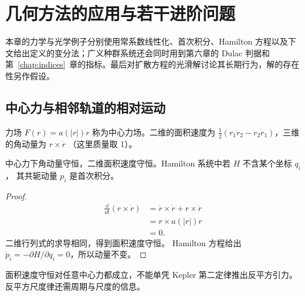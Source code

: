 \chapter{几何方法的应用与若干进阶问题}\label{chap:applications}

本章的力学与光学例子分别使用常系数线性化、首次积分、Hamilton 方程以及下文给出定义的变分法；广义种群系统还会同时用到第六章的 Dulac 判据和第~\ref{chap:indices}~章的指标。最后对扩散方程的光滑解讨论其长期行为，解的存在性另作假设。

\section{中心力与相邻轨道的相对运动}
\begin{definition}
力场 $F(r)=a(|r|)r$ 称为中心力场。二维的面积速度为
$\frac12(r_1\dot r_2-r_2\dot r_1)$，三维的角动量为 $r\times\dot r$
（这里质量取 1）。
\end{definition}
\begin{proposition}
中心力下角动量守恒，二维面积速度守恒。Hamilton 系统中若 $H$ 不含某个坐标 $q_i$，
其共轭动量 $p_i$ 是首次积分。
\end{proposition}
\begin{proof}
\[
 \begin{aligned}
 \frac{\dd}{\dd t}(r\times\dot r)
 &=\dot r\times\dot r+r\times\ddot r\\
 &=r\times a(|r|)r\\
 &=0.
\end{aligned}
\]
二维行列式的求导相同，得到面积速度守恒。
Hamilton 方程给出 $\dot p_i=-\partial H/\partial q_i=0$，所以动量不变。
\end{proof}
面积速度守恒对任意中心力都成立，不能单凭 Kepler 第二定律推出反平方引力。
反平方尺度律还需周期与尺度的信息。

